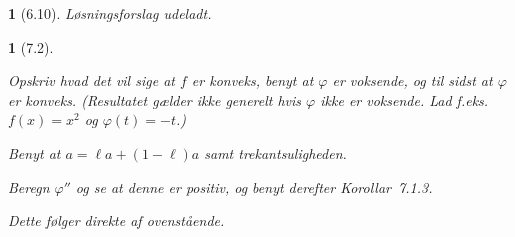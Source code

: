 \documentclass[a4paper, 11pt, article, danish, oneside]{memoir}
\renewcommand{\phi}{\varphi}
\newcommand{\pencilsymbol}{\raisebox{-2pt}{\normalfont\PencilLeft}}
\theoremstyle{changedotcustomnumber}
\newtheorem{opgave}{\pencilsymbol}
\theoremstyle{changedotbreakcustomnumber}
\newtheorem{opgavebreak}{\pencilsymbol}
\begin{document}
\begin{opgave}[6.10]
    Løsningsforslag udeladt.
\end{opgave}


\begin{opgavebreak}[7.2]
\begin{solutionsec}
    \item Opskriv hvad det vil sige at $f$ er konveks, benyt at $\phi$ er voksende, og til sidst at $\phi$ er konveks. (Resultatet gælder ikke generelt hvis $\phi$ ikke er voksende. Lad f.eks. $f(x) = x^2$ og $\phi(t) = -t$.)

    \item Benyt at $a = \ell a + (1-\ell)a$ samt trekantsuligheden.

    \item Beregn $\phi''$ og se at denne er positiv, og benyt derefter Korollar~7.1.3.

    \item Dette følger direkte af ovenstående.
\end{solutionsec}
\end{opgavebreak}
\end{document}
